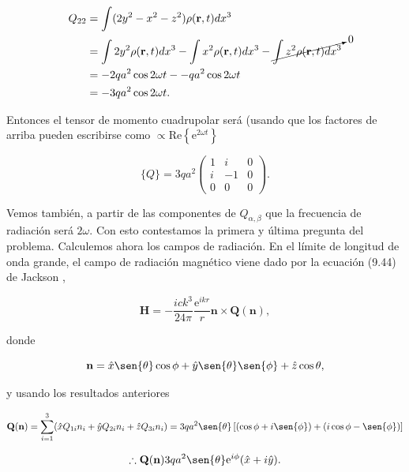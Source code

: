 \documentclass[a4paper,11pt]{article}
\numberwithin{equation}{section}
\newcommand{\euler}{\mathrm{e}}
\begin{document}
\begin{align*}
 Q_{22} &= \int (2y^2 - x^2 - z^2)\rho(\mathbf{r},t) dx^3 \\
 &= \int 2 y^2 \rho(\mathbf{r},t) dx^3 
 - \int x^2 \rho(\mathbf{r},t) dx^3 - \cancelto{0}{\int z^2\rho(\mathbf{r},t) dx^3} \\
 &= - 2 q a^2 \cos{2\omega t} - - q a^2 \cos{2\omega t}\\
 &= - 3 q a^2 \cos{2\omega t}.
\end{align*}

Entonces el tensor de momento cuadrupolar será (usando que los factores de arriba 
pueden escribirse como $\propto \text{Re}\left\{\euler^{2\omega t}\right\}$

\begin{equation}
 \{ Q \} = 3qa^2 \begin{pmatrix}
                  1 & i & 0 \\
                  i & -1 & 0 \\
                  0 & 0 & 0
                 \end{pmatrix}.
\end{equation}

Vemos también, a partir de las componentes de $Q_{\alpha,\beta}$ que 
la frecuencia de radiación será $2\omega$. Con esto contestamos la primera y 
última pregunta del problema. Calculemos ahora los campos de radiación. En el límite 
de longitud de onda grande, el campo de radiación magnético viene dado por la 
ecuación (9.44) de Jackson \cite{jackson}, 

\begin{equation}
 \mathbf{H} = - \frac{ick^3}{24\pi}\frac{\euler^{ikr}}{r} \mathbf{n} \times 
 \mathbf{Q}(\mathbf{n}), 
\end{equation}

donde 

\begin{equation}
 \mathbf{n} = \hat{x} \sen{\theta}\cos{\phi} + \hat{y} \sen{\theta}\sen{\phi} 
 + \hat{z} \cos{\theta},
\end{equation}

y usando los resultados anteriores

\begin{equation*}
 \mathbf{Q}(\mathbf{n}) = \sum_{i=1}^3 (\hat{x}Q_{1i} n_i + \hat{y}Q_{2i} n_i + 
 \hat{z}Q_{3i} n_i) = 3qa^2\sen{\theta}\left[(\cos{\phi} + i \sen{\phi}) 
 + (i\cos{\phi} - \sen{\phi})\right]
\end{equation*}

\begin{equation}
 \therefore \mathbf{Q}(\mathbf{n}) 3qa^2\sen{\theta} \euler^{i\phi}(\hat{x} + 
 i\hat{y}).
\end{equation}
\end{document}
